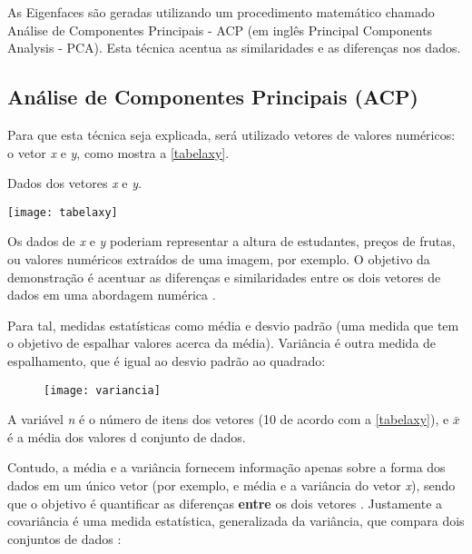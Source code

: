 As Eigenfaces são geradas utilizando um procedimento matemático chamado Análise de Componentes Principais - ACP (em inglês Principal Components Analysis - PCA). Esta técnica acentua as similaridades e as diferenças nos dados. 



\subsection{Análise de Componentes Principais (ACP)}\label{subsec:acp}

Para que esta técnica seja explicada, será utilizado vetores de valores numéricos: o vetor \textit{x} e \textit{y}, como mostra a \autoref{tabelaxy}.

\begin{table}[h]
	\centering
	\caption{Dados dos vetores \textit{x} e \textit{y}.}
	\texttt{[image: tabelaxy]}
	\label{tabelaxy}
\end{table}

Os dados de \textit{x} e \textit{y} poderiam representar a altura de estudantes, preços de frutas, ou valores numéricos extraídos de uma imagem, por exemplo. O objetivo da demonstração é acentuar as diferenças e similaridades entre os dois vetores de dados em uma abordagem numérica \cite{drmathew_java_programming}. 

Para tal, medidas estatísticas como média e desvio padrão (uma medida que tem o objetivo de espalhar valores acerca da média). Variância é outra medida de espalhamento, que é igual ao desvio padrão ao quadrado:

\begin{figure}[h]
	\centering
	\texttt{[image: variancia]}
	\label{fig:variancia}
\end{figure}

A variável \textit{n} é o número de itens dos vetores (10 de acordo com a \autoref{tabelaxy}), e $\bar{x}$  é a média dos valores d conjunto de dados.

Contudo, a média e a variância fornecem informação apenas sobre a forma dos dados em um único vetor (por exemplo, e média e a variância do vetor \textit{x}), sendo que o objetivo é quantificar as diferenças \textbf{entre} os dois vetores \cite{drmathew_java_programming}.  Justamente a covariância é uma medida estatística, generalizada da variância, que compara dois conjuntos de dados \cite{drmathew_java_programming}:

